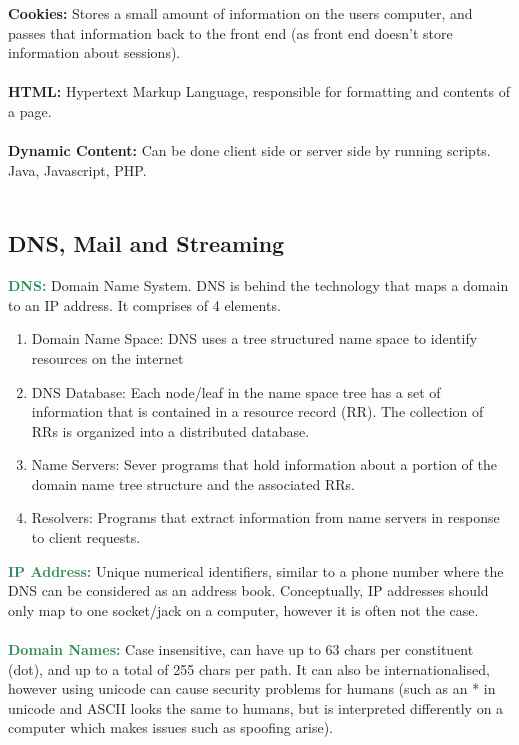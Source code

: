 \documentclass[a4paper,10pt]{article}
\begin{document}
\textcolor{JungleGreen}{\textbf{Cookies:}} Stores a small amount of information on the users computer, and passes that information back to the front end (as front end doesn't store information about sessions). \\\\
\textcolor{JungleGreen}{\textbf{HTML:}} Hypertext Markup Language, responsible for formatting and contents of a page.\\\\
\textcolor{JungleGreen}{\textbf{Dynamic Content:}} Can be done client side or server side by running scripts. Java, Javascript, PHP.\\\\
\subsection{DNS, Mail and Streaming}
\textcolor{SeaGreen}{\textbf{DNS:}} Domain Name System. DNS is behind the technology that maps a domain to an IP address. It comprises of 4 elements. 
\begin{enumerate}
	\item Domain Name Space: DNS uses a tree structured name space to identify resources on the internet 
	\item DNS Database: Each node/leaf in the name space tree has a set of information that is contained in a resource record (RR). The collection of RRs is organized into a distributed database. 
	\item Name Servers: Sever programs that hold information about a portion of the domain name tree structure and the associated RRs. 
	\item Resolvers: Programs that extract information from name servers in response to client requests. 
\end{enumerate}
\textcolor{SeaGreen}{\textbf{IP Address:}} Unique numerical identifiers, similar to a phone number where the DNS can be considered as an address book. Conceptually, IP addresses should only map to one socket/jack on a computer, however it is often not the case. \\\\
\textcolor{SeaGreen}{\textbf{Domain Names:}} Case insensitive, can have up to 63 chars per constituent (dot), and up to a total of 255 chars per path. It can also be internationalised, however using unicode can cause security problems for humans (such as an * in unicode and ASCII looks the same to humans, but is interpreted differently on a computer which makes issues such as spoofing arise). \\\\
\end{document}
